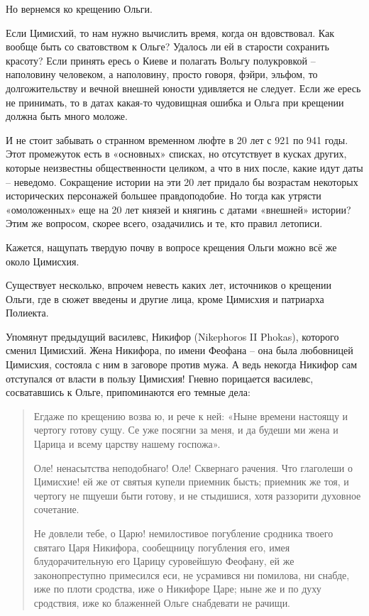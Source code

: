 Но вернемся ко крещению Ольги.

Если Цимисхий, то нам нужно вычислить время, когда он вдовствовал. Как вообще быть со сватовством к Ольге? Удалось ли ей в старости сохранить красоту? Если принять ересь о Киеве и полагать Вольгу полукровкой – наполовину человеком, а наполовину, просто говоря, фэйри, эльфом, то долгожительству и вечной внешней юности удивляется не следует. Если же ересь не принимать, то в датах какая-то чудовищная ошибка и Ольга при крещении должна быть много моложе.

И не стоит забывать о странном временном люфте в 20 лет с 921 по 941 годы. Этот промежуток есть в «основных» списках, но отсутствует в кусках других, которые неизвестны общественности целиком, а что в них после, какие идут даты – неведомо. Сокращение истории на эти 20 лет придало бы возрастам некоторых исторических персонажей большее правдоподобие. Но тогда как утрясти «омоложенных» еще на 20 лет князей и княгинь с датами «внешней» истории? Этим же вопросом, скорее всего, озадачились и те, кто правил летописи.

Кажется, нащупать твердую почву в вопросе крещения Ольги можно всё же около Цимисхия.

Существует несколько, впрочем невесть каких лет, источников о крещении Ольги, где в сюжет введены и другие лица, кроме Цимисхия и патриарха Полиекта. 

Упомянут предыдущий василевс, Никифор (Nikephor\-os II Phokas), которого сменил Цимисхий. Жена Никифора, по имени Феофана – она была любовницей Цимисхия, состояла с ним в заговоре против мужа. А ведь некогда Никифор сам отступался от власти в пользу Цимисхия! Гневно порицается василевс, сосватавшись к Ольге, припоминаются его темные дела:

\begin{quotation}
Егдаже по крещению возва ю, и рече к ней: «Ныне времени настоящу и чертогу готову сущу. Се уже посягни за меня, и да будеши ми жена и Царица и всему царству нашему госпожа».

Оле! ненасытства неподобнаго! Оле! Сквернаго рачения. Что глаголеши о Цимисхие! ей же от святыя купели приемник бысть; приемник же тоя, и чертогу не пщуеши быти готову, и не стыдишися, хотя раззорити духовное сочетание. 

Не довлели тебе, о Царю! немилостивое погубление сродника твоего святаго Царя Никифора, сообещницу погубления его, имея блудорачительную его Царицу суровейшую Феофану, ей же законопреступно примесился еси, не усрамився ни помилова, ни снабде, иже по плоти сродства, иже о Никифоре Царе; ныне же и по духу сродствия, иже ко блаженней Ольге снабдевати не рачищи.
\end{quotation}

